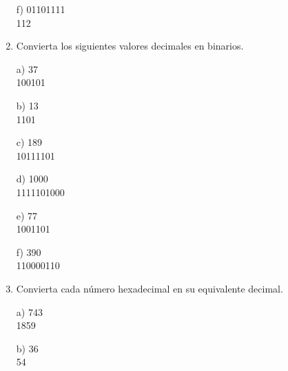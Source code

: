 \documentclass[a4paper, 12pt]{article}
\newcommand{\Aspace}{0.2cm}
\begin{document}
\begin{enumerate}
            \vspace{\Aspace} \par
            f) 01101111
            \\ { \color{azul} 112 }


        \item Convierta los siguientes valores decimales en binarios.
            \vspace{\Aspace} \par
            a) 37
            \\ { \color{azul} 100101 }

            \vspace{\Aspace} \par
            b) 13
            \\ { \color{azul} 1101 }

            \vspace{\Aspace} \par
            c) 189
            \\ { \color{azul} 10111101 }

            \vspace{\Aspace} \par
            d) 1000
            \\ { \color{azul} 1111101000 }

            \vspace{\Aspace} \par
            e) 77
            \\ { \color{azul} 1001101 }

            \vspace{\Aspace} \par
            f) 390
            \\ { \color{azul} 110000110 }


        \newpage
        \item Convierta cada número hexadecimal en su equivalente decimal.
            \vspace{\Aspace} \par
            a) 743
            \\ { \color{azul} 1859 }

            \vspace{\Aspace} \par
            b) 36
            \\ { \color{azul} 54 }


\end{enumerate}
\end{document}
